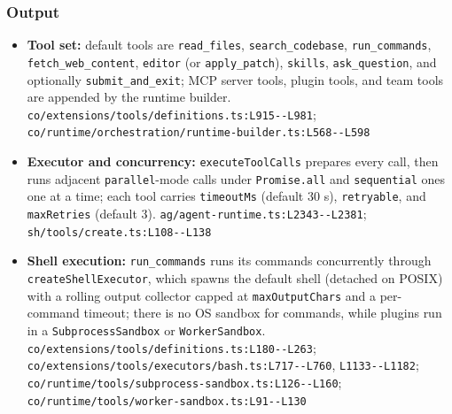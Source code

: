 \subsubsection*{Output}
\begin{itemize}
\item \textbf{Tool set:} default tools are \texttt{read\_\allowbreak{}files}, \texttt{search\_\allowbreak{}codebase}, \texttt{run\_\allowbreak{}commands}, \texttt{fetch\_\allowbreak{}web\_\allowbreak{}content}, \texttt{editor} (or \texttt{apply\_\allowbreak{}patch}), \texttt{skills}, \texttt{ask\_\allowbreak{}question}, and optionally \texttt{submit\_\allowbreak{}and\_\allowbreak{}exit}; MCP server tools, plugin tools, and team tools are appended by the runtime builder. \texttt{co/\allowbreak{}extensions/\allowbreak{}tools/\allowbreak{}definitions.\allowbreak{}ts:\allowbreak{}L915-\allowbreak{}-\allowbreak{}L981}; \texttt{co/\allowbreak{}runtime/\allowbreak{}orchestration/\allowbreak{}runtime-\allowbreak{}builder.\allowbreak{}ts:\allowbreak{}L568-\allowbreak{}-\allowbreak{}L598}
\item \textbf{Executor and concurrency:} \texttt{executeToolCalls} prepares every call, then runs adjacent \texttt{parallel}-mode calls under \texttt{Promise.\allowbreak{}all} and \texttt{sequential} ones one at a time; each tool carries \texttt{timeoutMs} (default 30 s), \texttt{retryable}, and \texttt{maxRetries} (default 3). \texttt{ag/\allowbreak{}agent-\allowbreak{}runtime.\allowbreak{}ts:\allowbreak{}L2343-\allowbreak{}-\allowbreak{}L2381}; \texttt{sh/\allowbreak{}tools/\allowbreak{}create.\allowbreak{}ts:\allowbreak{}L108-\allowbreak{}-\allowbreak{}L138}
\item \textbf{Shell execution:} \texttt{run\_\allowbreak{}commands} runs its commands concurrently through \texttt{createShellExecutor}, which spawns the default shell (detached on POSIX) with a rolling output collector capped at \texttt{maxOutputChars} and a per-command timeout; there is no OS sandbox for commands, while plugins run in a \texttt{SubprocessSandbox} or \texttt{WorkerSandbox}. \texttt{co/\allowbreak{}extensions/\allowbreak{}tools/\allowbreak{}definitions.\allowbreak{}ts:\allowbreak{}L180-\allowbreak{}-\allowbreak{}L263}; \texttt{co/\allowbreak{}extensions/\allowbreak{}tools/\allowbreak{}executors/\allowbreak{}bash.\allowbreak{}ts:\allowbreak{}L717-\allowbreak{}-\allowbreak{}L760}, \texttt{L1133-\allowbreak{}-\allowbreak{}L1182}; \texttt{co/\allowbreak{}runtime/\allowbreak{}tools/\allowbreak{}subprocess-\allowbreak{}sandbox.\allowbreak{}ts:\allowbreak{}L126-\allowbreak{}-\allowbreak{}L160}; \texttt{co/\allowbreak{}runtime/\allowbreak{}tools/\allowbreak{}worker-\allowbreak{}sandbox.\allowbreak{}ts:\allowbreak{}L91-\allowbreak{}-\allowbreak{}L130}

\end{itemize}
